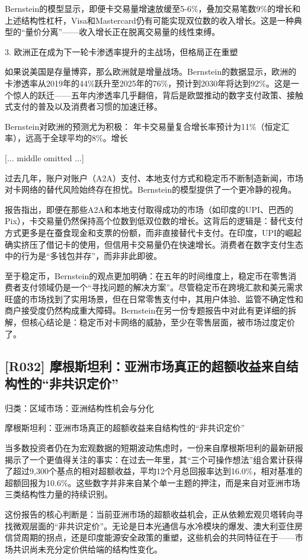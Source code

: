 \documentclass[11pt]{ctexart}
\begin{document}
Bernstein的模型显示，即便卡交易量增速放缓至5-6\%，叠加交易笔数9\%的增长和上述结构性杠杆，Visa和Mastercard仍有可能实现双位数的收入增长。这是一种典型的“量价分离”——收入增长正在脱离交易量的线性束缚。

3. 欧洲正在成为下一轮卡渗透率提升的主战场，但格局正在重塑

如果说美国是存量博弈，那么欧洲就是增量战场。Bernstein的数据显示，欧洲的卡渗透率从2019年的44\%跃升至2025年的76\%，预计到2030年将达到92\%。这是一个惊人的跃迁——五年内渗透率几乎翻倍，背后是欧盟推动的数字支付政策、接触式支付的普及以及消费者习惯的加速迁移。

Bernstein对欧洲的预测尤为积极： 年卡交易量复合增长率预计为11\%（恒定汇率），远高于全球平均的8\%。增长

[... middle omitted ...]


过去几年，账户对账户（A2A）支付、本地支付方式和稳定币不断制造新闻，市场对卡网络的替代风险始终存在担忧。Bernstein的模型提供了一个更冷静的视角。

报告指出，即便在那些A2A和本地支付取得成功的市场（如印度的UPI、巴西的Pix），卡交易量仍然保持高个位数到低双位数的增长。这背后的逻辑是：替代支付方式更多是在蚕食现金和支票的份额，而非直接替代卡支付。在印度，UPI的崛起确实挤压了借记卡的使用，但信用卡交易量仍在快速增长。消费者在数字支付生态中的行为是“多钱包并存”，而非非此即彼。

至于稳定币，Bernstein的观点更加明确：在五年的时间维度上，稳定币在零售消费者支付领域仍是一个“寻找问题的解决方案”。尽管稳定币在跨境汇款和美元需求旺盛的市场找到了实用场景，但在日常零售支付中，其用户体验、监管不确定性和商户接受度仍然构成重大障碍。Bernstein在另一份专题报告中对此有更详细的拆解，但核心结论是：稳定币对卡网络的威胁，至少在零售层面，被市场过度定价了。

\subsection{[R032] 摩根斯坦利：亚洲市场真正的超额收益来自结构性的“非共识定价”}
{\small\color{refgray}归类：区域市场：亚洲结构性机会与分化}

摩根斯坦利：亚洲市场真正的超额收益来自结构性的“非共识定价”

当多数投资者仍在为宏观数据的短期波动焦虑时，一份来自摩根斯坦利的最新研报揭示了一个更值得关注的事实：在过去一年里，其“三个可操作想法”组合累计获得了超过9,300个基点的相对超额收益，平均12个月总回报率达到16.0\%，相对基准的超额回报为10.6\%。这些数字并非来自某个单一主题的押注，而是来自对亚洲市场三类结构性力量的持续识别。

这份报告的核心判断是：当前亚洲市场的超额收益机会，正从依赖宏观贝塔转向寻找微观层面的“非共识定价”。无论是日本光通信与水冷模块的爆发、澳大利亚住房信贷周期的拐点，还是印度能源安全政策的重塑，这些机会的共同特征在于——市场共识尚未充分定价供给端的结构性变化。
\end{document}
